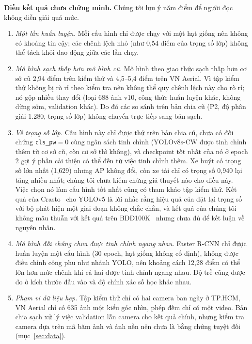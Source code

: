\documentclass[10pt,journal,letterpaper]{IEEEtran}
\begin{document}
\textbf{Điều kết quả chưa chứng minh.} Chúng tôi lưu ý năm điểm để người đọc không diễn giải quá mức.
\begin{enumerate}
\item \emph{Một lần huấn luyện.} Mỗi cấu hình chỉ được chạy với một hạt giống nên không có khoảng tin cậy; các chênh lệch nhỏ (như 0,54 điểm của trọng số lớp) không thể tách khỏi dao động giữa các lần chạy.
\item \emph{Mô hình sạch thấp hơn mô hình cũ.} Mô hình theo giao thức sạch thấp hơn cơ sở cũ 2,94 điểm trên kiểm thử và 4,5--5,4 điểm trên VN Aerial. Vì tập kiểm thử không bị rò rỉ theo kiểm tra nên không thể quy chênh lệch này cho rò rỉ; nó gộp nhiều thay đổi (loại 688 ảnh v10, công thức huấn luyện khác, không dừng sớm, validation khác). Do đó các so sánh trên bản chia cũ (P2, độ phân giải 1.280, trọng số lớp) không chuyển trực tiếp sang bản sạch.
\item \emph{Về trọng số lớp.} Cấu hình này chỉ được thử trên bản chia cũ, chưa có đối chứng \texttt{cls\_pw}$=0$ cùng ngân sách tinh chỉnh (YOLOv8s-CW được tinh chỉnh thêm từ cơ sở cũ, còn cơ sở thì không), và checkpoint tốt nhất của nó ở epoch 2 gợi ý phần cải thiện có thể đến từ việc tinh chỉnh thêm. Xe buýt có trọng số lớn nhất (1,629) nhưng AP không đổi, còn xe tải chỉ có trọng số 0,940 lại tăng nhiều nhất; chúng tôi chưa kiểm chứng giả thuyết nào cho điều này. Việc chọn nó làm cấu hình tốt nhất cũng có tham khảo tập kiểm thử. Kết quả của Crasto~\cite{crasto} cho YOLOv5 là lời nhắc rằng hiệu quả của đặt lại trọng số với bộ phát hiện một giai đoạn không chắc chắn, và kết quả của chúng tôi không mâu thuẫn với kết quả trên BDD100K~\cite{phan} nhưng chưa đủ để kết luận về nguyên nhân.
\item \emph{Mô hình đối chứng chưa được tinh chỉnh ngang nhau.} Faster R-CNN chỉ được huấn luyện một cấu hình (30 epoch, hạt giống không cố định), không được điều chỉnh công phu như nhánh YOLO, nên khoảng cách 12,28 điểm có thể lớn hơn mức chênh khi cả hai được tinh chỉnh ngang nhau. Độ trễ cũng được đo ở kích thước đầu vào và độ chính xác số học khác nhau.
\item \emph{Phạm vi dữ liệu hẹp.} Tập kiểm thử chỉ có hai camera ban ngày ở TP.HCM, VN Aerial chỉ có 635 ảnh một kiểu góc nhìn, phép đếm chỉ có một video. Bản chia sạch xử lý việc validation lẫn camera cho kết quả chính, nhưng kiểm tra camera dựa trên mã băm ảnh và ảnh nền nên chưa là bằng chứng tuyệt đối (mục~\ref{sec:data}).
\end{enumerate}
\end{document}

